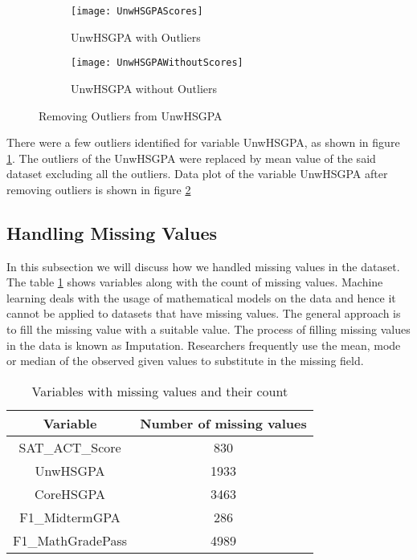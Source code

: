\documentclass[11pt,openright]{report}
\begin{document}
\begin{figure}
\centering
    \begin{subfigure}[b]{0.55\textwidth}            
            \texttt{[image: UnwHSGPAScores]}
            \caption{UnwHSGPA with Outliers}
            \label{fig:UnwHSGPA-with-outliers}
    \end{subfigure}%
    \begin{subfigure}[b]{0.55\textwidth}
            \centering
            \texttt{[image: UnwHSGPAWithoutScores]}
            \caption{UnwHSGPA without Outliers}
            \label{fig:UnwHSGPA-No-outliers}
    \end{subfigure}
    \caption{Removing Outliers from UnwHSGPA}\label{fig:unwHSGPA}
\end{figure}

 There were a few outliers identified for variable UnwHSGPA, as shown in figure \ref{fig:UnwHSGPA-with-outliers}. The outliers of the UnwHSGPA were replaced by mean value of the said dataset excluding all the outliers. Data plot of the variable UnwHSGPA after removing outliers is shown in figure \ref{fig:UnwHSGPA-No-outliers}


\subsection {Handling Missing Values}
In this subsection we will discuss how we handled missing values in the dataset. The table \ref{table:missing_db} shows variables along with the count of missing values. Machine learning deals with the usage of mathematical models on the data and hence it cannot be applied to datasets that have missing values. The general approach is to fill the missing value with a suitable value. The process of filling missing values in the data is known as Imputation. Researchers frequently use the mean, mode or median of the observed given values to substitute in the missing field.
 \begin{table}[!t]
	\renewcommand{\arraystretch}{1.3}
	\caption{Variables with missing values and their count}
	\label{table:missing_db}
	\centering
	\begin{tabular}{|c|c|}
		\hline
		\bfseries Variable & \bfseries Number of missing values \\
		\hline
		SAT\_ACT\_Score & 830\\ \hline
		UnwHSGPA & 1933\\ \hline
		CoreHSGPA & 3463\\ \hline
		F1\_MidtermGPA & 286\\ \hline
		F1\_MathGradePass & 4989\\ \hline
	\end{tabular}
\end{table}
\end{document}
